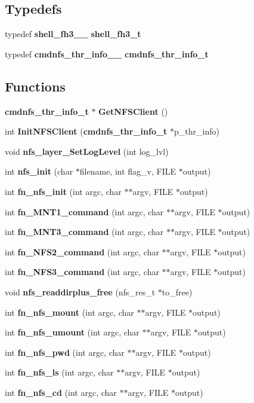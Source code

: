 \subsection*{Typedefs}
\begin{CompactItemize}
\item 
typedef {\bf shell\_\-fh3\_\-\_\-} {\bf shell\_\-fh3\_\-t}
\item 
typedef {\bf cmdnfs\_\-thr\_\-info\_\-\_\-} {\bf cmdnfs\_\-thr\_\-info\_\-t}
\end{CompactItemize}
\subsection*{Functions}
\begin{CompactItemize}
\item 
{\bf cmdnfs\_\-thr\_\-info\_\-t} $\ast$ {\bf Get\-NFSClient} ()
\item 
int {\bf Init\-NFSClient} ({\bf cmdnfs\_\-thr\_\-info\_\-t} $\ast$p\_\-thr\_\-info)
\item 
void {\bf nfs\_\-layer\_\-Set\-Log\-Level} (int log\_\-lvl)
\item 
int {\bf nfs\_\-init} (char $\ast$filename, int flag\_\-v, FILE $\ast$output)
\item 
int {\bf fn\_\-nfs\_\-init} (int argc, char $\ast$$\ast$argv, FILE $\ast$output)
\item 
int {\bf fn\_\-MNT1\_\-command} (int argc, char $\ast$$\ast$argv, FILE $\ast$output)
\item 
int {\bf fn\_\-MNT3\_\-command} (int argc, char $\ast$$\ast$argv, FILE $\ast$output)
\item 
int {\bf fn\_\-NFS2\_\-command} (int argc, char $\ast$$\ast$argv, FILE $\ast$output)
\item 
int {\bf fn\_\-NFS3\_\-command} (int argc, char $\ast$$\ast$argv, FILE $\ast$output)
\item 
void {\bf nfs\_\-readdirplus\_\-free} (nfs\_\-res\_\-t $\ast$to\_\-free)
\item 
int {\bf fn\_\-nfs\_\-mount} (int argc, char $\ast$$\ast$argv, FILE $\ast$output)
\item 
int {\bf fn\_\-nfs\_\-umount} (int argc, char $\ast$$\ast$argv, FILE $\ast$output)
\item 
int {\bf fn\_\-nfs\_\-pwd} (int argc, char $\ast$$\ast$argv, FILE $\ast$output)
\item 
int {\bf fn\_\-nfs\_\-ls} (int argc, char $\ast$$\ast$argv, FILE $\ast$output)
\item 
int {\bf fn\_\-nfs\_\-cd} (int argc, char $\ast$$\ast$argv, FILE $\ast$output)

\end{CompactItemize}

